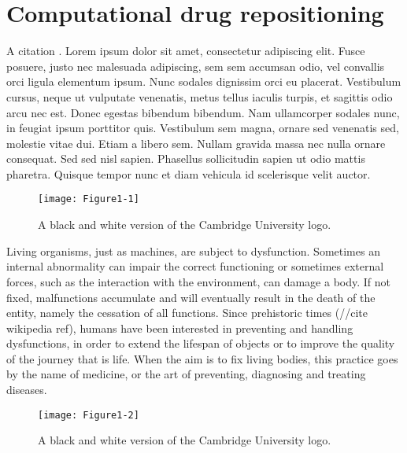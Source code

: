 \chapter{Computational drug repositioning}

A citation \cite{example}. Lorem ipsum dolor \citep{Gaulton2012} sit amet, consectetur adipiscing elit. Fusce posuere, justo nec malesuada adipiscing, sem sem accumsan odio, vel convallis orci ligula elementum ipsum. Nunc sodales dignissim orci eu placerat. Vestibulum cursus, neque ut vulputate venenatis, metus tellus iaculis turpis, et sagittis odio arcu nec est. Donec egestas bibendum bibendum. Nam ullamcorper sodales nunc, in feugiat ipsum porttitor quis. Vestibulum sem magna, ornare sed venenatis sed, molestie vitae dui. Etiam a libero sem. Nullam gravida massa nec nulla ornare consequat. Sed sed nisl sapien. Phasellus sollicitudin sapien ut odio mattis pharetra. Quisque tempor nunc et diam vehicula id scelerisque velit auctor.

\begin{figure}[ht]
    \centering
    \texttt{[image: Figure1-1]}
    \caption[Cambridge University BW Logo]{A black and white version of the Cambridge University logo.}
    \label{fig:bwUasasdniLogo}
\end{figure}

Living organisms, just as machines, are subject to dysfunction. Sometimes an internal abnormality can impair the correct functioning or sometimes external forces, such as the interaction with the environment, can damage a body. If not fixed, malfunctions accumulate and will eventually result in the death of the entity, namely the cessation of all functions. Since prehistoric times (//cite wikipedia ref), humans have been interested in preventing and handling dysfunctions, in order to extend the lifespan of objects or to improve the quality of the journey that is life. When the aim is to fix living bodies, this practice goes by the name of medicine, or the art of preventing, diagnosing and treating diseases.

\begin{figure}[ht]
    \centering
    \texttt{[image: Figure1-2]}
    \caption[Cambridge University BW Logo]{A black and white version of the Cambridge University logo.}
    \label{fig:bwUniLogo}
\end{figure}

